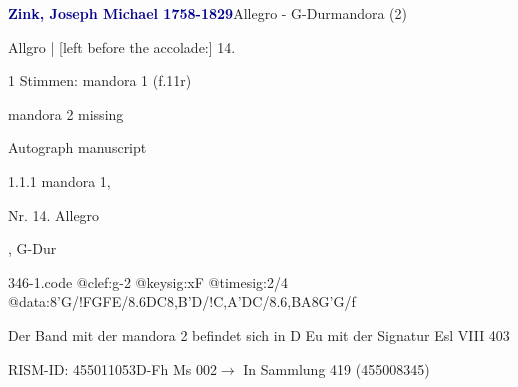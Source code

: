 \documentclass[twocolumn, 12pt]{book}
\begin{document}
\par \vspace{16pt} \textcolor{darkblue}{\textbf{Zink, Joseph Michael  1758-1829}}\hfillplus{\textbf{[346]}}\newline Allegro - G-Dur\newline mandora (2)
\par \begin{itshape}[f.11r, at left:] Allgro | [left before the accolade:] 14.\end{itshape} 
\par \textcolor{darkblue}{}  1 Stimmen: mandora 1  (f.11r)\newline \begin{small} mandora 2 missing\end{small} \newline Autograph manuscript
\par 1.1.1  mandora 1, \begin{itshape}Nr. 14. Allegro\end{itshape}, G-Dur  
\begin{filecontents*}{346-1.code}
@clef:g-2
@keysig:xF
@timesig:2/4
@data:8'G/!FGFE/{8.6DC}8,B'D/!{C,A}'DC/{8.6,BA}8G'G/f
\end{filecontents*}
\newline %
\par Der Band mit der mandora 2 befindet sich in D Eu mit der Signatur Esl VIII 403
\par RISM-ID: 455011053\newline D-Fh  Ms 002\newline $\rightarrow$ In Sammlung 419 (455008345)
      
\end{document}
